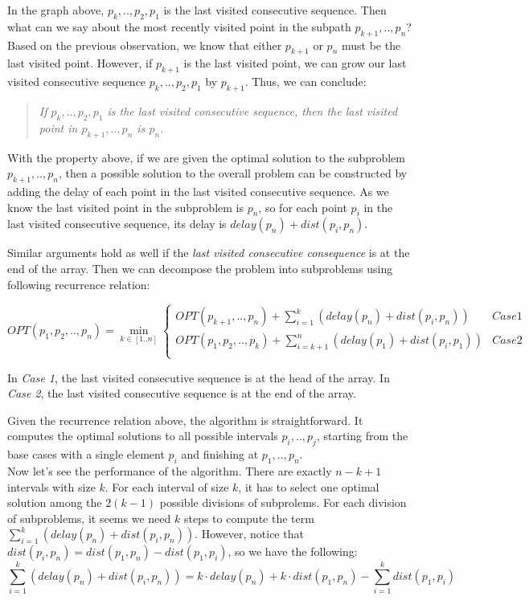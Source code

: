 In the graph above, $p_k, .., p_2, p_1$ is the last visited consecutive sequence. Then what can we say about the most recently visited point in the subpath $p_{k+1}, .., p_n$? Based on the previous observation, we know that either $p_{k+1}$ or $p_n$ must be the last visited point. However, if $p_{k+1}$ is the last visited point, we can grow our last visited consecutive sequence $p_k, .., p_2, p_1$ by $p_{k+1}$. Thus, we can conclude:

\begin{quote}
\textit{If $p_k, .., p_2, p_1$ is the last visited consecutive sequence, then the last visited point in $p_{k+1}, .., p_n$ is $p_n$.}
\end{quote}

With the property above, if we are given the optimal solution to the subproblem $p_{k+1}, .., p_n$, then a possible solution to the overall problem can be constructed by adding the delay of each point in the last visited consecutive sequence. As we know the last visited point in the subproblem is $p_n$, so for each point $p_i$ in the last visited consecutive sequence, its delay is $delay(p_n) + dist(p_i, p_n)$.

Similar arguments hold as well if the \textit{last visited consecutive consequence} is at the end of the array. Then we can decompose the problem into subproblems using following recurrence relation:

\[
OPT(p_1, p_2, .., p_n) = \min_{k \in [1..n]} \left\{
  \begin{array}{ll}
    OPT(p_{k+1}, .., p_n) + \sum_{i=1}^{k}(delay(p_n) + dist(p_i, p_n)) & Case 1 \\
    OPT(p_1, p_2, .., p_k) + \sum_{i=k+1}^{n}(delay(p_1) + dist(p_i, p_1)) & Case 2 \\
  \end{array}\right.
\]

In \textit{Case 1}, the last visited consecutive sequence is at the head of the array. In \textit{Case 2}, the last visited consecutive sequence is at the end of the array.

Given the recurrence relation above, the algorithm is straightforward. It computes the optimal solutions to all possible intervals $p_i, .., p_j$, starting from the base cases with a single element $p_i$ and finishing at $p_1, .., p_n$.\\

Now let's see the performance of the algorithm. There are exactly $n - k + 1$ intervals with size $k$. For each interval of size $k$, it has to select one optimal solution among the $2(k-1)$ possible divisions of subprolems. For each division of subproblems, it seems we need $k$ steps to compute the term $\sum_{i=1}^{k}(delay(p_n) + dist(p_i, p_n))$. However, notice that $dist(p_i, p_n) = dist(p_1, p_n) - dist(p_1, p_i)$, so we have the following:
\[
\sum_{i=1}^{k}(delay(p_n) + dist(p_i, p_n)) = k \cdot delay(p_n) + k \cdot dist(p_1, p_n) - \sum_{i=1}^{k}dist(p_1, p_i)
\]

